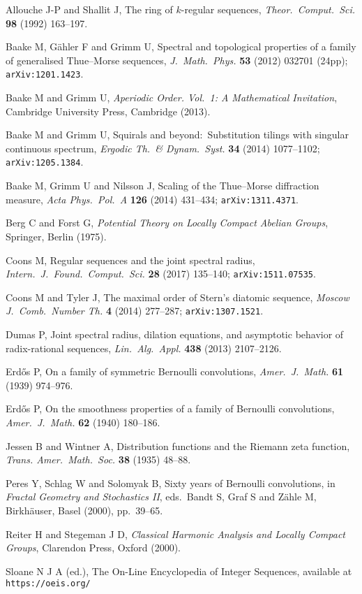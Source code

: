 \documentclass[11pt,a4paper]{amsart}
\theoremstyle{plain}
\theoremstyle{definition}
\numberwithin{equation}{section}
\begin{document}
\begin{thebibliography}{99}

Allouche J-P and Shallit J, 
The ring of {$k$}-regular sequences, 
\textit{Theor.\ Comput.\ Sci.} \textbf{98} (1992) 163--197.
  
Baake M, G\"{a}hler F and Grimm U,
Spectral and topological properties of a family of 
generalised Thue--Morse sequences,
\textit{J.\ Math.\ Phys.} \textbf{53} (2012) 032701 (24pp);
\texttt{arXiv:1201.1423}.

Baake M and Grimm U,
\textit{Aperiodic Order. Vol.\ 1: A Mathematical Invitation},
Cambridge University Press, Cambridge (2013).

Baake M and Grimm U,
Squirals and beyond:\ Substitution tilings with singular 
continuous spectrum,
\textit{Ergodic Th.\ \& Dynam.\ Syst.} \textbf{34} (2014)
1077--1102; \texttt{arXiv:1205.1384}.

Baake M, Grimm U and Nilsson J,
Scaling of the Thue--Morse diffraction measure,
\textit{Acta Phys.\ Pol.\ A} \textbf{126} (2014) 431--434;
\texttt{arXiv:1311.4371}.

Berg C and Forst G,
\textit{Potential Theory on Locally Compact Abelian Groups},
Springer, Berlin (1975).

Coons M, 
Regular sequences and the joint spectral radius,
\textit{Intern.\ J.\ Found.\ Comput.\ Sci.}
\textbf{28} (2017) 135--140; \texttt{arXiv:1511.07535}.

Coons M and Tyler J, 
The maximal order of {S}tern's diatomic sequence,
\textit{Moscow J.\ Comb.\ Number Th.} \textbf{4} (2014) 277--287;
\texttt{arXiv:1307.1521}.

Dumas P, 
Joint spectral radius, dilation equations, and asymptotic
behavior of radix-rational sequences, 
\textit{Lin.\ Alg.\ Appl.} \textbf{438} (2013) 2107--2126. 

Erd\H{o}s P,
{On a family of symmetric Bernoulli convolutions},
\textit{Amer.\ J.\ Math.} \textbf{61} (1939) 974--976.

Erd\H{o}s P,
{On the smoothness properties of a family of Bernoulli convolutions},
\textit{Amer.\ J.\ Math.} \textbf{62} (1940) 180--186.

Jessen B and Wintner A,
Distribution functions and the Riemann zeta function,
\textit{Trans. Amer.\ Math.\ Soc.} \textbf{38} (1935) 48--88.

Peres Y, Schlag W and Solomyak B, 
{Sixty years of Bernoulli convolutions},
in \textit{Fractal Geometry and Stochastics II},
eds.\ Bandt S, Graf S and Z\"{a}hle M,
Birkh\"{a}user, Basel (2000), pp.~39--65.

Reiter H and Stegeman J D,
\textit{Classical Harmonic Analysis and
Locally Compact Groups}, Clarendon Press, Oxford (2000).

Sloane N J A (ed.),
The On-Line Encyclopedia of Integer Sequences,
available at \texttt{https://oeis.org/}

\end{thebibliography}
\end{document}
